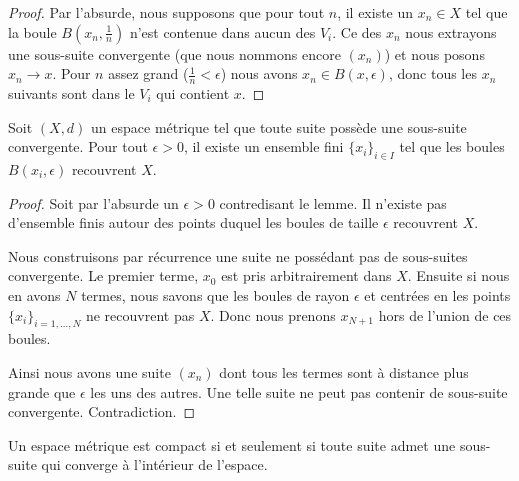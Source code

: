 \begin{proof}
    Par l'absurde, nous supposons que pour tout \( n\), il existe un \( x_n\in X\) tel que la boule \( B(x_n,\frac{1}{ n })\) n'est contenue dans aucun des \( V_i\). Ce des \( x_n\) nous extrayons une sous-suite convergente (que nous nommons encore \( (x_n)\)) et nous posons \( x_n\to x\). Pour \( n\) assez grand (\( \frac{1}{ n }<\epsilon\)) nous avons \( x_n\in B(x,\epsilon)\), donc tous les \( x_n\) suivants sont dans le \( V_i\) qui contient \( x\).
\end{proof}

\begin{lemma}   \label{LemMGQqgDG}
    Soit \( (X,d)\) un espace métrique tel que toute suite possède une sous-suite convergente. Pour tout \( \epsilon>0\), il existe un ensemble fini \( \{ x_i \}_{i\in I}\) tel que les boules \( B(x_i,\epsilon)\) recouvrent \( X\).
\end{lemma}

\begin{proof}
    Soit par l'absurde un \( \epsilon>0\) contredisant le lemme. Il n'existe pas d'ensemble finis autour des points duquel les boules de taille \( \epsilon\) recouvrent \( X\).

    Nous construisons par récurrence une suite ne possédant pas de sous-suites convergente. Le premier terme, \( x_0\) est pris arbitrairement dans \( X\). Ensuite si nous en avons \( N\) termes, nous savons que les boules de rayon \( \epsilon\) et centrées en les points \( \{ x_i \}_{i=1,\ldots, N}\) ne recouvrent pas \( X\). Donc nous prenons \( x_{N+1}\) hors de l'union de ces boules.

    Ainsi nous avons une suite \( (x_n)\) dont tous les termes sont à distance plus grande que \( \epsilon\) les uns des autres. Une telle suite ne peut pas contenir de sous-suite convergente. Contradiction.
\end{proof}

\begin{theorem}\label{ThoBWFTXAZNH}
    Un espace métrique est compact si et seulement si toute suite admet une sous-suite qui converge à l'intérieur de l'espace.
\end{theorem}

